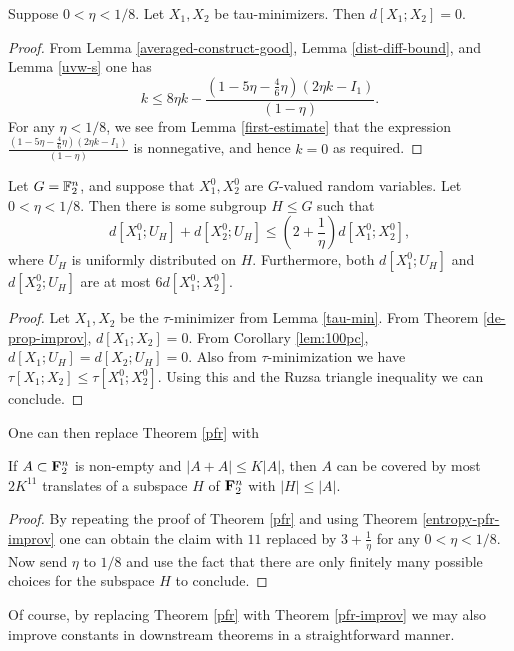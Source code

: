 \begin{theorem}\label{de-prop-improv}\leanok
Suppose $0 < \eta < 1/8$.  Let $X_1, X_2$ be tau-minimizers.  Then $d[X_1;X_2] = 0$.
\end{theorem}

\begin{proof}  From Lemma \ref{averaged-construct-good}, Lemma \ref{dist-diff-bound}, and Lemma \ref{uvw-s} one has
  \[ k \leq 8\eta k - \frac{(1 -5 \eta - \frac{4}{6} \eta)(2 \eta k - I_1)}{(1-\eta)}.\]
  For any $\eta < 1/8$, we see from Lemma \ref{first-estimate} that the expression $\frac{(1 -5 \eta - \frac{4}{6} \eta)(2 \eta k - I_1)}{(1-\eta)}$ is nonnegative, and hence $k = 0$ as required.
\end{proof}

\begin{theorem}\label{entropy-pfr-improv}\leanok
  Let $G = \mathbb{F}_2^n$, and suppose that $X^0_1, X^0_2$ are $G$-valued random variables. Let $0 < \eta < 1/8$.
  Then there is some subgroup $H \leq G$ such that
  \[
    d[X^0_1;U_H] + d[X^0_2;U_H] \le (2+\frac{1}{\eta}) d[X^0_1;X^0_2],
  \]
  where $U_H$ is uniformly distributed on $H$.
  Furthermore, both $d[X^0_1;U_H]$ and $d[X^0_2;U_H]$ are at most $6 d[X^0_1;X^0_2]$.
\end{theorem}

\begin{proof}    Let $X_1, X_2$ be the $\tau$-minimizer from Lemma \ref{tau-min}.  From Theorem \ref{de-prop-improv}, $d[X_1;X_2]=0$.  From Corollary \ref{lem:100pc}, $d[X_1;U_H] = d[X_2; U_H] = 0$.  Also from $\tau$-minimization we have $\tau[X_1;X_2] \leq \tau[X^0_1;X^0_2]$.  Using this and the Ruzsa triangle inequality we can conclude.
\end{proof}

One can then replace Theorem \ref{pfr} with

\begin{theorem}\label{pfr-improv}\leanok
  If $A \subset {\bf F}_2^n$ is non-empty and $|A+A| \leq K|A|$, then $A$ can be covered by most $2K^{11}$ translates of a subspace $H$ of ${\bf F}_2^n$ with $|H| \leq |A|$.
\end{theorem}

\begin{proof} By repeating the proof of Theorem \ref{pfr} and using Theorem \ref{entropy-pfr-improv} one can obtain the claim with $11$ replaced by $3 +\frac{1}{\eta}$ for any $0 < \eta < 1/8$.  Now send $\eta$ to $1/8$ and use the fact that there are only finitely many possible choices for the subspace $H$ to conclude.
\end{proof}

Of course, by replacing Theorem \ref{pfr} with Theorem \ref{pfr-improv} we may also improve constants in downstream theorems in a straightforward manner.

